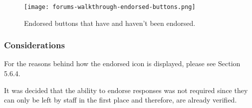 \begin{figure}[h!]
    \texttt{[image: forums-walkthrough-endorsed-buttons.png]}
    \centering
    \caption{Endorsed buttons that have and haven't been endorsed.}
\end{figure}

\subsubsection{Considerations}
For the reasons behind how the endorsed icon is displayed, please see Section 5.6.4.

It was decided that the ability to endorse responses was not required since they can only be left by staff in the first place and therefore, are already verified.